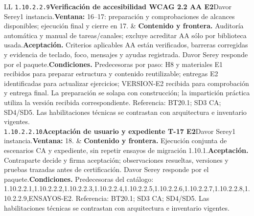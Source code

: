 \begin{longtable}{L{\tabcolsep\relax}L{\tabcolsep\relax}}
\texttt{1.\allowbreak{}10.\allowbreak{}2.\allowbreak{}2.\allowbreak{}9}\newline{}\textbf{Verificación de accesibilidad WCAG 2.2 AA E2}\newline{}Davor Serey\newline{}1 instancia.\newline{}\textbf{Ventana:} 16--17: preparación y comprobaciones de alcances disponibles; ejecución final y cierre en 17. & \textbf{Contenido y frontera.} Auditoría automática y manual de tareas/canales; excluye acreditar AA sólo por biblioteca usada.\newline{}\textbf{Aceptación.} Criterios aplicables AA están verificados, barreras corregidas y evidencia de teclado, foco, mensajes y ayudas registrada. Davor Serey responde por el paquete.\newline{}\textbf{Condiciones.} Predecesoras por paso: H8 y materiales E1 recibidos para preparar estructura y contenido reutilizable; entregas E2 identificadas para actualizar ejercicios; VERSION-E2 recibida para comprobación y entrega final. La preparación se solapa con construcción; la impartición práctica utiliza la versión recibida correspondiente. Referencia: BT20.1; SD3 CA; SD4/SD5. Las habilitaciones técnicas se contrastan con arquitectura e inventario vigentes.\\\hline
\texttt{1.\allowbreak{}10.\allowbreak{}2.\allowbreak{}2.\allowbreak{}10}\newline{}\textbf{Aceptación de usuario y expediente T-17 E2}\newline{}Davor Serey\newline{}1 instancia.\newline{}\textbf{Ventana:} 18. & \textbf{Contenido y frontera.} Ejecución conjunta de escenarios CA y expediente, sin repetir ensayos de migración 1.10.1.\newline{}\textbf{Aceptación.} Contraparte decide y firma aceptación; observaciones resueltas, versiones y pruebas trazadas antes de certificación. Davor Serey responde por el paquete.\newline{}\textbf{Condiciones.} Predecesoras del catálogo: 1.10.2.2.1,1.10.2.2.2,1.10.2.2.3,1.10.2.2.4,1.10.2.2.5,1.10.2.2.6,1.10.2.2.7,1.10.2.2.8,1.10.2.2.9,ENSAYOS-E2. Referencia: BT20.1; SD3 CA; SD4/SD5. Las habilitaciones técnicas se contrastan con arquitectura e inventario vigentes.\\\hline

\end{longtable}
